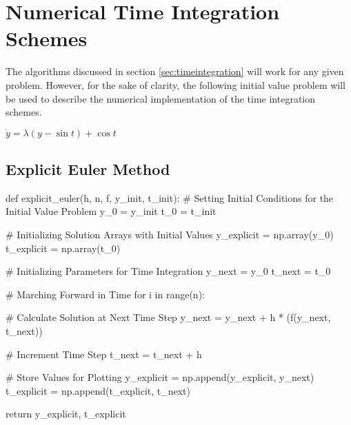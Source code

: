 \section{Numerical Time Integration Schemes}
The algorithms discussed in section \ref{sec:timeintegration} will work for any given problem. However, for the sake of clarity, the following initial value problem will be used to describe the numerical implementation of the time integration schemes.
\begin{center}
$\dot{y} = \lambda (y - \sin t) + \cos t$
\end{center}

\subsection{Explicit Euler Method}
\begin{python}
def explicit_euler(h, n, f, y_init, t_init):
    # Setting Initial Conditions for the Initial Value Problem
    y_0 = y_init
    t_0 = t_init

    # Initializing Solution Arrays with Initial Values
    y_explicit = np.array(y_0)
    t_explicit = np.array(t_0)

    # Initializing Parameters for Time Integration
    y_next = y_0
    t_next = t_0

    # Marching Forward in Time
    for i in range(n):

        # Calculate Solution at Next Time Step
        y_next = y_next + h * (f(y_next, t_next))

        # Increment Time Step
        t_next = t_next + h

        # Store Values for Plotting
        y_explicit = np.append(y_explicit, y_next)
        t_explicit = np.append(t_explicit, t_next)

    return y_explicit, t_explicit
\end{python}


